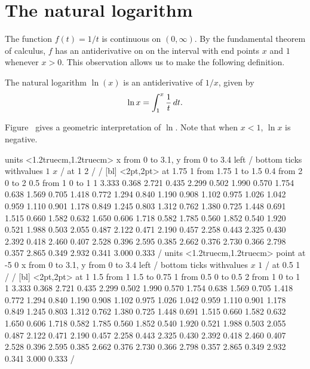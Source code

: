 \section{The natural logarithm}{}{}
\nobreak
The function $f(t)=1/t$ is continuous on $(0, \infty ) $.
By the fundamental theorem of calculus, $f$ has an antiderivative on
on the interval with end points $x$ and $1$ whenever $x>0 $. This
observation allows us to make the following definition.

\begin{definition} The {\dfont natural logarithm} $\ln(x)$ is an antiderivative of
$1/x$, given by 
$$\ln x = \int _1 ^x {1\over t}\,dt.$$
\end{definition}

Figure~ gives a geometric interpretation of $\ln$.
Note that when $x<1$, $\ln x$ is negative.

\figure
\vbox{\beginpicture
\normalgraphs
\ninepoint
\setcoordinatesystem units <1.2truecm,1.2truecm>
\setplotarea x from 0 to 3.1, y from 0 to 3.4
\axis left /
\axis bottom ticks withvalues {$1$} {$x$} / at 1 2 / /
 [bl] <2pt,2pt> at 1.75 1
\arrow <4pt> [0.35, 1] from 1.75 1 to 1.5 0.4
\putrule from 2 0 to 2 0.5
\putrule from 1 0 to 1 1
 3.333 0.368 2.721 0.435 2.299 0.502 1.990 0.570 1.754 
0.638 1.569 0.705 1.418 0.772 1.294 0.840 1.190 0.908 1.102 
0.975 1.026 1.042 0.959 1.110 0.901 1.178 0.849 1.245 0.803 
1.312 0.762 1.380 0.725 1.448 0.691 1.515 0.660 1.582 0.632 
1.650 0.606 1.718 0.582 1.785 0.560 1.852 0.540 1.920 0.521 
1.988 0.503 2.055 0.487 2.122 0.471 2.190 0.457 2.258 0.443 
2.325 0.430 2.392 0.418 2.460 0.407 2.528 0.396 2.595 0.385 
2.662 0.376 2.730 0.366 2.798 0.357 2.865 0.349 2.932 0.341 
3.000 0.333 /
\setcoordinatesystem units <1.2truecm,1.2truecm> point at -5 0
\setplotarea x from 0 to 3.1, y from 0 to 3.4
\axis left /
\axis bottom ticks withvalues {$x$} {$1$} / at 0.5 1 / /
 [bl] <2pt,2pt> at 1 1.5
\arrow <4pt> [0.35, 1] from 1 1.5 to 0.75 1
\putrule from 0.5 0 to 0.5 2
\putrule from 1 0 to 1 1
 3.333 0.368 2.721 0.435 2.299 0.502 1.990 0.570 1.754 
0.638 1.569 0.705 1.418 0.772 1.294 0.840 1.190 0.908 1.102 
0.975 1.026 1.042 0.959 1.110 0.901 1.178 0.849 1.245 0.803 
1.312 0.762 1.380 0.725 1.448 0.691 1.515 0.660 1.582 0.632 
1.650 0.606 1.718 0.582 1.785 0.560 1.852 0.540 1.920 0.521 
1.988 0.503 2.055 0.487 2.122 0.471 2.190 0.457 2.258 0.443 
2.325 0.430 2.392 0.418 2.460 0.407 2.528 0.396 2.595 0.385 
2.662 0.376 2.730 0.366 2.798 0.357 2.865 0.349 2.932 0.341 
3.000 0.333 /
\endpicture}

